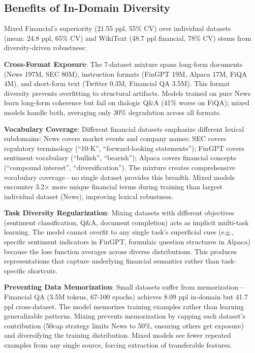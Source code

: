 \subsection{Benefits of In-Domain Diversity}

Mixed Financial's superiority (21.55 ppl, 55\% CV) over individual datasets (mean: 24.8 ppl, 65\% CV) and WikiText (48.7 ppl financial, 78\% CV) stems from diversity-driven robustness:

\textbf{Cross-Format Exposure}: The 7-dataset mixture spans long-form documents (News 197M, SEC 80M), instruction formats (FinGPT 19M, Alpaca 17M, FiQA 4M), and short-form text (Twitter 0.3M, Financial QA 3.5M). This format diversity prevents overfitting to structural artifacts. Models trained on pure News learn long-form coherence but fail on dialogic Q\&A (41\% worse on FiQA); mixed models handle both, averaging only 30\% degradation across all formats.

\textbf{Vocabulary Coverage}: Different financial datasets emphasize different lexical subdomains: News covers market events and company names; SEC covers regulatory terminology (``10-K'', ``forward-looking statements''); FinGPT covers sentiment vocabulary (``bullish'', ``bearish''); Alpaca covers financial concepts (``compound interest'', ``diversification''). The mixture creates comprehensive vocabulary coverage—no single dataset provides this breadth. Mixed models encounter 3.2$\times$ more unique financial terms during training than largest individual dataset (News), improving lexical robustness.

\textbf{Task Diversity Regularization}: Mixing datasets with different objectives (sentiment classification, Q\&A, document completion) acts as implicit multi-task learning. The model cannot overfit to any single task's superficial cues (e.g., specific sentiment indicators in FinGPT, formulaic question structures in Alpaca) because the loss function averages across diverse distributions. This produces representations that capture underlying financial semantics rather than task-specific shortcuts.

\textbf{Preventing Data Memorization}: Small datasets suffer from memorization—Financial QA (3.5M tokens, 67-100 epochs) achieves 8.09 ppl in-domain but 41.7 ppl cross-dataset. The model memorizes training examples rather than learning generalizable patterns. Mixing prevents memorization by capping each dataset's contribution (50cap strategy limits News to 50\%, ensuring others get exposure) and diversifying the training distribution. Mixed models see fewer repeated examples from any single source, forcing extraction of transferable features.

